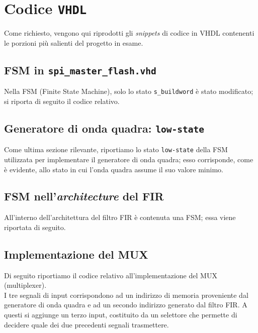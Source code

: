 \documentclass[a4paper,11pt]{article}
\begin{document}
\section{Codice \texttt{VHDL}}
Come richiesto, vengono qui riprodotti gli \emph{snippets} di codice in VHDL contenenti le porzioni più salienti del progetto in esame.

\subsection{FSM in \texttt{spi\_master\_flash.vhd}}
Nella FSM (Finite State Machine), solo lo stato \texttt{s\_buildword} è stato modificato; si riporta di seguito il codice relativo.



\subsection{Generatore di onda quadra: \texttt{low-state}}
Come ultima sezione rilevante, riportiamo lo stato \texttt{low-state} della FSM utilizzata per implementare il generatore di onda quadra; esso corrisponde, come è evidente, allo stato in cui l'onda quadra assume il suo valore minimo.


\subsection{FSM nell'\emph{architecture} del FIR}
All'interno dell'architettura del filtro FIR è contenuta una FSM; essa viene riportata di seguito.



\subsection{Implementazione del MUX}
Di seguito riportiamo il codice relativo all'implementazione del MUX (multiplexer).
\\
I tre segnali di input corrispondono ad un indirizzo di memoria proveniente dal generatore di onda quadra e ad un secondo indirizzo generato dal filtro FIR. A questi si aggiunge un terzo input, costituito da un selettore che permette di decidere quale dei due precedenti segnali trasmettere.
\end{document}
